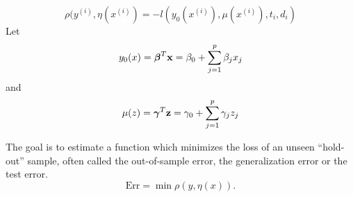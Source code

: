 \begin{equation}
    \rho(y^{(i)},\eta(x^{(i)})=-l(y_0(x^{(i)}), \mu(x^{(i)}), t_i, d_i)
\end{equation}
Let
\begin{equation}
    y_0(x)=\boldsymbol{\beta}^T\mathbf{x}=\beta_0+\sum_{j=1}^p \beta_jx_j
\end{equation}
and
\begin{equation}
    \mu(z)=\boldsymbol{\gamma}^T\mathbf{z}=\gamma_0+\sum_{j=1}^p \gamma_jz_j
\end{equation}

The goal is to estimate a function which minimizes the loss of an unseen ``hold-out'' sample, often called the out-of-sample error, the generalization error or the test error.
\begin{equation}
    \text{Err}=\min\rho(y,\eta(x)).
\end{equation}